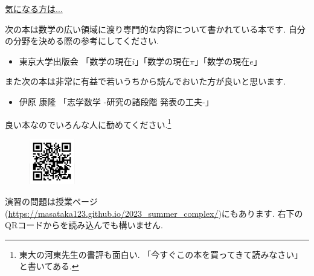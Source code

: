 \documentclass[dvipdfmx,a4paper,11pt]{article}
\theoremstyle{definition}
\begin{document}
   \vspace{12pt}
\hspace{-24pt}\underline{気になる方は...}

次の本は数学の広い領域に渡り専門的な内容について書かれている本です. 自分の分野を決める際の参考にしてください. 

\begin{itemize}
\setlength{\parskip}{0cm} 
  \setlength{\itemsep}{0cm} 
\item 東京大学出版会  「数学の現在$i$」「数学の現在$\pi$」「数学の現在$e$」
   \end{itemize}
また次の本は非常に有益で若いうちから読んでおいた方が良いと思います. 
\begin{itemize}
\setlength{\parskip}{0cm} 
  \setlength{\itemsep}{0cm} 
  \item 伊原 康隆 「志学数学 -研究の諸段階 発表の工夫-」
   \end{itemize}
良い本なのでいろんな人に勧めてください.\footnote{東大の河東先生の書評も面白い. 「今すぐこの本を買ってきて読みなさい」と書いてある.}


 \vspace{11pt}\begin{figure}  \centering\includegraphics[height=20mm, width=20mm]{complex.png}\end{figure}

演習の問題は授業ページ(\url{https://masataka123.github.io/2023_summer_complex/})にもあります. 右下のQRコードからを読み込んでも構いません.


  



  
  
 
\end{document}
